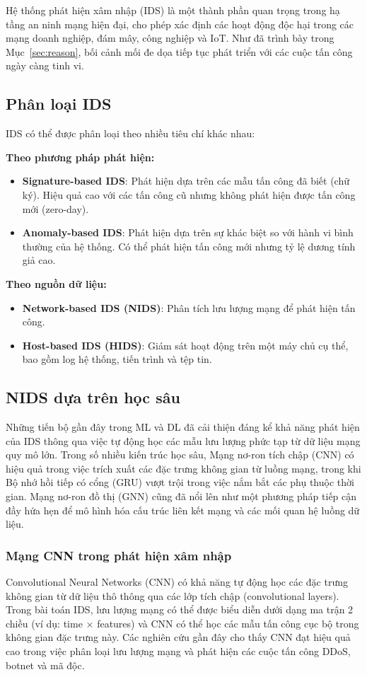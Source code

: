 Hệ thống phát hiện xâm nhập (IDS) là một thành phần quan trọng trong hạ tầng an ninh mạng hiện đại, cho phép xác định các hoạt động độc hại trong các mạng doanh nghiệp, đám mây, công nghiệp và IoT. Như đã trình bày trong Mục~\ref{sec:reason}, bối cảnh mối đe dọa tiếp tục phát triển với các cuộc tấn công ngày càng tinh vi.

\subsection{Phân loại IDS}
IDS có thể được phân loại theo nhiều tiêu chí khác nhau:

\textbf{Theo phương pháp phát hiện:}
\begin{itemize}
    \item \textbf{Signature-based IDS}: Phát hiện dựa trên các mẫu tấn công đã biết (chữ ký). Hiệu quả cao với các tấn công cũ nhưng không phát hiện được tấn công mới (zero-day).
    \item \textbf{Anomaly-based IDS}: Phát hiện dựa trên sự khác biệt so với hành vi bình thường của hệ thống. Có thể phát hiện tấn công mới nhưng tỷ lệ dương tính giả cao.
\end{itemize}

\textbf{Theo nguồn dữ liệu:}
\begin{itemize}
    \item \textbf{Network-based IDS (NIDS)}: Phân tích lưu lượng mạng để phát hiện tấn công.
    \item \textbf{Host-based IDS (HIDS)}: Giám sát hoạt động trên một máy chủ cụ thể, bao gồm log hệ thống, tiến trình và tệp tin.
\end{itemize}

\subsection{NIDS dựa trên học sâu}
Những tiến bộ gần đây trong ML và DL đã cải thiện đáng kể khả năng phát hiện của IDS thông qua việc tự động học các mẫu lưu lượng phức tạp từ dữ liệu mạng quy mô lớn. Trong số nhiều kiến trúc học sâu, Mạng nơ-ron tích chập (CNN) có hiệu quả trong việc trích xuất các đặc trưng không gian từ luồng mạng, trong khi Bộ nhớ hồi tiếp có cổng (GRU) vượt trội trong việc nắm bắt các phụ thuộc thời gian. Mạng nơ-ron đồ thị (GNN) cũng đã nổi lên như một phương pháp tiếp cận đầy hứa hẹn để mô hình hóa cấu trúc liên kết mạng và các mối quan hệ luồng dữ liệu.

\subsubsection{Mạng CNN trong phát hiện xâm nhập}
Convolutional Neural Networks (CNN) có khả năng tự động học các đặc trưng không gian từ dữ liệu thô thông qua các lớp tích chập (convolutional layers). Trong bài toán IDS, lưu lượng mạng có thể được biểu diễn dưới dạng ma trận 2 chiều (ví dụ: time $\times$ features) và CNN có thể học các mẫu tấn công cục bộ trong không gian đặc trưng này. Các nghiên cứu gần đây cho thấy CNN đạt hiệu quả cao trong việc phân loại lưu lượng mạng và phát hiện các cuộc tấn công DDoS, botnet và mã độc.

